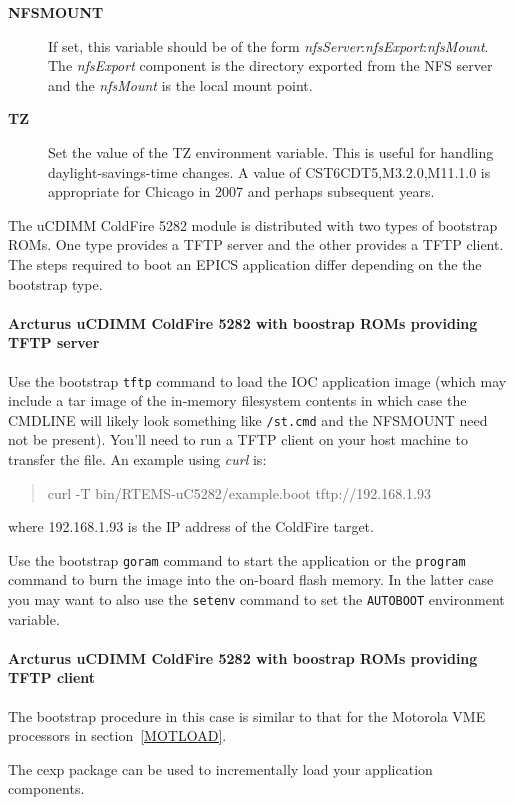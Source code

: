 \documentclass{report}
\begin{document}
\begin{description}
\item[{\bf NFSMOUNT}]
If set, this variable should be of the form
\textit{nfsServer}:\textit{nfsExport}:\textit{nfsMount}.
The \textit{nfsExport} component is the directory exported from the NFS server
and the \textit{nfsMount} is the local mount point.

\item[{\bf TZ}]
Set the value of the TZ environment variable.
This is useful for handling daylight-savings-time changes.  A value of
CST6CDT5,M3.2.0,M11.1.0 is appropriate for Chicago in 2007 and perhaps subsequent years.

\end{description}

The uCDIMM ColdFire 5282 module is distributed with two types of bootstrap ROMs.  One type provides a TFTP server and the other provides a TFTP client.
The steps required to boot an EPICS application differ depending on the the bootstrap type.

\paragraph{Arcturus uCDIMM ColdFire 5282 with boostrap ROMs providing TFTP server}
Use the bootstrap {\tt tftp} command to load the IOC application image
(which may include a tar image of the in-memory filesystem contents in which case the CMDLINE will likely look something like {\tt /st.cmd} and the NFSMOUNT need not be present).
You'll need to run a TFTP client on your host machine to transfer the
file.  An example using {\it curl} is:
\begin{quote}
curl -T bin/RTEMS-uC5282/example.boot tftp://192.168.1.93
\end{quote}
where 192.168.1.93 is the IP address of the ColdFire target.

Use the bootstrap {\tt goram} command to start the application or the
{\tt program} command to burn the image into the on-board flash memory.  In
the latter case you may want to also use the {\tt setenv} command to set the
{\tt AUTOBOOT} environment variable.

\paragraph{Arcturus uCDIMM ColdFire 5282 with boostrap ROMs providing TFTP client}
The bootstrap procedure in this case is similar to that for the Motorola VME processors in section~\ref{MOTLOAD}.

The cexp package can be used to
incrementally load your application components.
\end{document}
